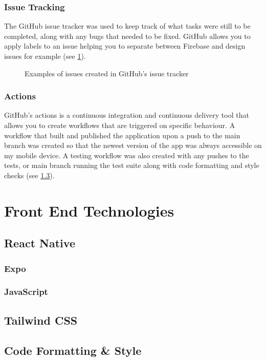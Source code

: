 \subsubsection{Issue Tracking}
The GitHub issue tracker was used to keep track of what tasks were still to be completed, along with any bugs that needed to be fixed. GitHub allows you to apply labels to an issue helping you to separate between Firebase and design issues for example (see \ref{fig:issues}).
\begin{figure}[!htbp]
    \centering
    \begin{subfigure}[b]{0.90\textwidth}
    \end{subfigure}
    \caption{Examples of issues created in GitHub's issue tracker}
    \label{fig:issues}
\end{figure}
\subsubsection{Actions}
GitHub's actions is a continuous integration and continuous delivery tool that allows you to create workflows that are triggered on specific behaviour. A workflow that built and published the application upon a push to the main branch was created so that the newest version of the app was always accessible on my mobile device. A testing workflow was also created with any pushes to the tests, or main branch running the test suite along with code formatting and style checks (see \ref{CodeF&S}).
\section{Front End Technologies}
\subsection{React Native}
\subsubsection{Expo}
\subsubsection{JavaScript}
\subsection{Tailwind CSS}
\subsection{Code Formatting \& Style} \label{CodeF&S}
